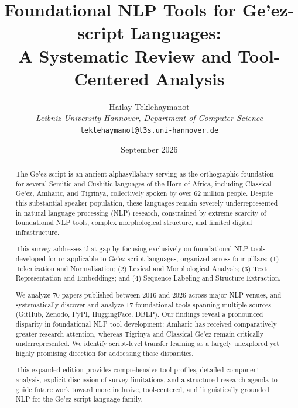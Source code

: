 \documentclass[12pt,a4paper]{article}
\theoremstyle{plain}
\theoremstyle{definition}
\begin{document}

\title{Foundational NLP Tools for Ge'ez-script Languages:\\A Systematic Review and Tool-Centered Analysis}

\author{Hailay Teklehaymanot\\
\textit{Leibniz University Hannover, Department of Computer Science}\\
\texttt{teklehaymanot@l3s.uni-hannover.de}}

\date{September 2026}

\maketitle

\tableofcontents
\newpage


\begin{abstract}
The Ge'ez script is an ancient alphasyllabary serving as the orthographic foundation for several Semitic and Cushitic languages of the Horn of Africa, including Classical Ge'ez, Amharic, and Tigrinya, collectively spoken by over 62 million people. Despite this substantial speaker population, these languages remain severely underrepresented in natural language processing (NLP) research, constrained by extreme scarcity of foundational NLP tools, complex morphological structure, and limited digital infrastructure.

This survey addresses that gap by focusing exclusively on foundational NLP tools developed for or applicable to Ge'ez-script languages, organized across four pillars: (1) Tokenization and Normalization; (2) Lexical and Morphological Analysis; (3) Text Representation and Embeddings; and (4) Sequence Labeling and Structure Extraction.

We analyze 70 papers published between 2016 and 2026 across major NLP venues, and systematically discover and analyze 17 foundational tools spanning multiple sources (GitHub, Zenodo, PyPI, HuggingFace, DBLP). Our findings reveal a pronounced disparity in foundational NLP tool development: Amharic has received comparatively greater research attention, whereas Tigrinya and Classical Ge'ez remain critically underrepresented. We identify script-level transfer learning as a largely unexplored yet highly promising direction for addressing these disparities.

This expanded edition provides comprehensive tool profiles, detailed component analysis, explicit discussion of survey limitations, and a structured research agenda to guide future work toward more inclusive, tool-centered, and linguistically grounded NLP for the Ge'ez-script language family.
\end{abstract}
\end{document}
